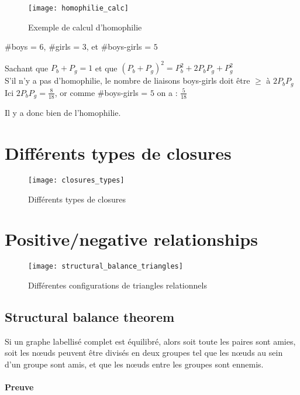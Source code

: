 \begin{figure}[H]
    \centering
    \texttt{[image: homophilie\_calc]}
    \caption{Exemple de calcul d'homophilie}
\end{figure}

\#boys = $6$, \#girls = $3$, et \#boys-girls = $5$

Sachant que $P_b + P_g = 1$ et que $(P_b + P_g)^2 = P_b^2 + 2P_bP_g + P_g^2$\\
S'il n'y a pas d'homophilie, le nombre de liaisons boys-girls doit être $\geq$ à $2P_bP_g$\\
Ici $2P_bP_g = \frac{8}{18}$, or comme \#boys-girls = $5$ on a : $\frac{5}{18}$

Il y a donc bien de l'homophilie.

\section{Différents types de closures}

\begin{figure}[H]
    \centering
    \texttt{[image: closures\_types]}
    \caption{Différents types de closures}
\end{figure}

\section{Positive/negative relationships}

\begin{figure}[H]
    \centering
    \texttt{[image: structural\_balance\_triangles]}
    \caption{Différentes configurations de triangles relationnels}
\end{figure}

\subsection{Structural balance theorem}

Si un graphe labellisé complet est équilibré, alors soit toute les paires sont amies, soit les nœuds peuvent être divisés en deux groupes tel que les nœuds au sein d'un groupe sont amis, et que les nœuds entre les groupes sont ennemis.

\paragraph{Preuve}


